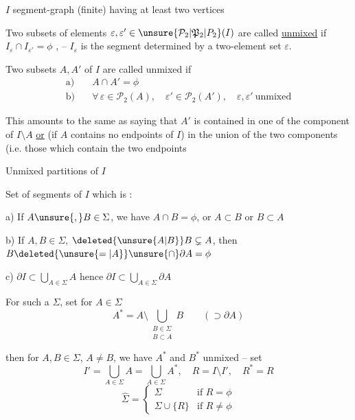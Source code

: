 $I$ segment-graph (finite) having at least two vertices

Two subsets of elements $\varepsilon,\varepsilon'\in\unsure{\mathcal{P}_2|\mathfrak{P}_2|P_2}(I)$ are called \uline{unmixed} if  $I_{\varepsilon}\cap I_{\varepsilon'}=\phi$ , -- $I_{\varepsilon}$ is the segment determined by a two-element set $\varepsilon$.

Two subsets $A,A'$ of $I$ are called unmixed if
\[
\begin{aligned}
\text{a)}\quad &A\cap A'=\phi\\
\text{b)}\quad &\forall\,\varepsilon\in\mathcal{P}_2(A),\quad \varepsilon'\in\mathcal{P}_2(A'),\quad \varepsilon,\varepsilon'\ \text{unmixed}
\end{aligned}
\]

\reversemarginpar{}
This amounts to the same as saying that $A'$ is contained in one of the component  of $I\setminus A$ \uline{or} (if $A$ contains no endpoints of $I$) in the union of the two components   (i.e. those which contain the two endpoints

\normalmarginpar

Unmixed partitions of $I$

Set \inserted{$\Sigma$} of segments of $I$ which is :

a) If $A\unsure{,}B\in\Sigma$, we have $A\cap B=\phi$, or $A\subset B$ or $B\subset A$

b) If $A,B\in\Sigma$, $\deleted{\unsure{A|B}}B\subsetneq A$, then $B\deleted{\unsure{=|A}}\unsure{\cap}\partial A=\phi$

c) \deleted{\unsure{$\forall$|$\forall\varepsilon$}} $\partial I\subset\bigcup\limits_{A\in\Sigma} A$ hence $\partial I\subset\bigcup\limits_{A\in\Sigma}\partial A$

For such a $\Sigma$, set for $A\in\Sigma$
\[
A^{\ast}=A\setminus\bigcup_{\substack{B\in\Sigma\\B\subset A}} B \qquad (\supset\partial A)
\]

then  for $A,B\in\Sigma$, $A\ne B$, we have $A^{\ast}$ and $B^{\ast}$ unmixed -- set   
\[
I'=\bigcup_{A\in\Sigma}A=\bigcup_{A\in\Sigma} A^{\ast},\quad R=I\setminus I',\quad R^{\ast}=R
\]
\[
\hat{\Sigma}=\begin{cases}
\Sigma &\text{if }R=\phi\\
\Sigma\cup\{R\} &\text{if }R\ne\phi
\end{cases}
\]
